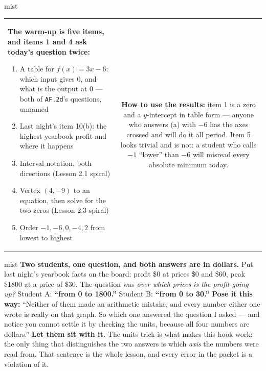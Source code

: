 \documentclass[10pt]{article}
\begin{document}
\begin{fixedskillbox}{mist}
\begin{tabularx}{\linewidth}{@{}X c@{}}
\begin{minipage}[t]{0.55\linewidth}\vspace{0pt}
\textbf{The warm-up is five items, and items 1 and 4 ask today's question twice:}
\begin{enumerate}[leftmargin=1.4em, itemsep=1pt, topsep=2pt]
  \item A table for $f(x)=3x-6$: which input gives $0$, and what is the output at $0$ --- both of
        \texttt{AF.2d}'s questions, unnamed
  \item Last night's item 10(b): the highest yearbook profit and where it happens
  \item Interval notation, both directions (Lesson 2.1 spiral)
  \item Vertex $(4,-9)$ to an equation, then solve for the two zeros (Lesson 2.3 spiral)
  \item Order $-1, -6, 0, -4, 2$ from lowest to highest
\end{enumerate}
\end{minipage}
&
\begin{minipage}[t]{0.38\linewidth}\vspace{0pt}
\textbf{How to use the results:} item 1 is a zero and a $y$-intercept in table form --- anyone who
answers (a) with $-6$ has the axes crossed and will do it all period. Item 5 looks trivial and is
not: a student who calls $-1$ ``lower'' than $-6$ will misread every absolute minimum today.
\end{minipage}
\end{tabularx}
\end{fixedskillbox}

\begin{skillbox}[Hook]{mist}
\textbf{Two students, one question, and both answers are in dollars.} Put last night's yearbook facts
on the board: profit \$0 at prices \$0 and \$60, peak \$1800 at a price of \$30. The question was
\emph{over which prices is the profit going up?} \quad Student A: \textbf{``from 0 to 1800.''}
Student B: \textbf{``from 0 to 30.''} \textbf{Pose it this way:} ``Neither of them made an arithmetic
mistake, and every number either one wrote is really on that graph. So which one answered the
question I asked --- and notice you cannot settle it by checking the units, because all four numbers
are dollars.'' \textbf{Let them sit with it.} The units trick is what makes this hook work: the only
thing that distinguishes the two answers is which \emph{axis} the numbers were read from. That
sentence is the whole lesson, and every error in the packet is a violation of it.
\end{skillbox}
\end{document}
